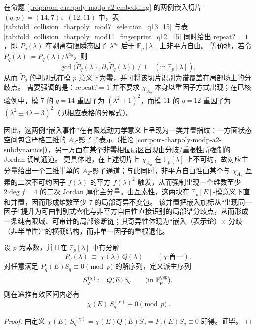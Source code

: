\begin{remark}\label{rem:pom-a2-embedding-local-ramification}
在命题 \ref{prop:pom-charpoly-modp-a2-embedding} 的两例嵌入切片 \((q,p)=(14,7)\)、\((12,11)\) 中，表 \ref{tab:fold_collision_charpoly_mod7_selection_q13_15} 与表 \ref{tab:fold_collision_charpoly_mod11_fingerprint_q12_15} 同时给出 \(\mathrm{repeat?}=1\)，即 \(P_q(\lambda)\) 在剥离有限瞬态因子 \(\lambda^{a_0}\) 后于 \(\mathbb{F}_p[\lambda]\) 上非平方自由。
等价地，若令 \(\widetilde P_q(\lambda):=P_q(\lambda)/\lambda^{a_0}\)，则
\[
\gcd\!\bigl(\widetilde P_q(\lambda),\partial_\lambda \widetilde P_q(\lambda)\bigr)\neq 1\quad(\mathrm{in}\ \mathbb{F}_p[\lambda]),
\]
从而 \(\widetilde P_q\) 的判别式在模 \(p\) 意义下为零，并可将该切片识别为谱覆盖在局部场上的分歧点。
需要强调的是：\(\mathrm{repeat?}=1\) 并不要求 \(\chi_{A_2}\) 本身以重因子方式出现；在已核验例中，模 \(7\) 的 \(q=14\) 重因子为 \((\lambda^2+1)^2\)，而模 \(11\) 的 \(q=12\) 重因子为 \((\lambda^2\pm 4\lambda-3)^2\)（见相应表格的分解式）。
\par
因此，这两例“嵌入事件”在有限域动力学意义上呈现为一类并置指纹：一方面状态空间包含严格三维的 \(A_2\)-影子子表示（推论 \ref{cor:pom-charpoly-modp-a2-subdynamics}），另一方面在某个非零相位扇区出现由分歧/重根性所强制的 Jordan 调制通道。
更具体地，在上述切片上 \(\chi_{A_2}\) 在 \(\mathbb{F}_p[\lambda]\) 上不可约，故对应主分量给出一个三维半单的 \(A_2\)-影子通道；与此同时，非平方自由性由某个与 \(\chi_{A_2}\) 互素的二次不可约因子 \(f(\lambda)\) 的平方 \(f(\lambda)^2\) 触发，从而强制出现一个维数至少 \(2\deg f=4\) 的二次 Jordan 厚化主分量。由互素性，这两块在 \(\mathbb{F}_p[E]\)-模意义下直和并置，因而形成维数至少 \(7\) 的局部奇异不变包。
该并置把嵌入旗标从“出现同一因子”提升为可由判别式零化与非平方自由性直接识别的局部谱分歧点，从而形成一条纯有限域、可审计的局部诊断链；其奇异性体现为“嵌入（表示论）\(\times\) 分歧（非半单性）”的横截结构，而非单一因子的重根退化。
\end{remark}

\begin{proposition}\label{prop:pom-modp-factor-extraction}
设 \(p\) 为素数，并且在 \(\mathbb{F}_p[\lambda]\) 中有分解
\[
P_q(\lambda)\ \equiv\ \chi(\lambda)\,Q(\lambda)\qquad(\chi\ \text{首一}).
\]
对任意满足 \(P_q(E)S_q\equiv 0\pmod p\) 的解序列，定义派生序列
\[
S_q^{(\chi)}:=Q(E)\,S_q\qquad(\mathrm{in}\ \mathbb{F}_p^{\NN}).
\]
则在递推有效区间内必有
\[
\boxed{\ \chi(E)\,S_q^{(\chi)}\equiv 0\pmod p\ }.
\]
\end{proposition}
\begin{proof}
由定义
\(
\chi(E)\,S_q^{(\chi)}=\chi(E)Q(E)S_q=P_q(E)S_q\equiv 0
\)
即得。证毕。
\end{proof}

